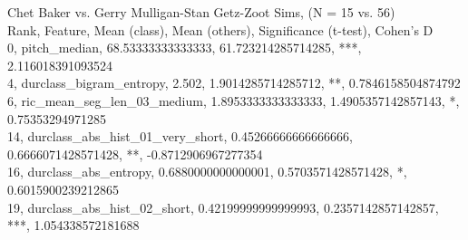 Chet Baker vs. Gerry Mulligan-Stan Getz-Zoot Sims, (N = 15 vs. 56)\\
Rank, Feature, Mean (class), Mean (others), Significance (t-test), Cohen's D\\
0, pitch_median, 68.53333333333333, 61.723214285714285, ***, 2.116018391093524\\
4, durclass_bigram_entropy, 2.502, 1.9014285714285712, **, 0.7846158504874792\\
6, ric_mean_seg_len_03_medium, 1.8953333333333333, 1.4905357142857143, *, 0.75353294971285\\
14, durclass_abs_hist_01_very_short, 0.45266666666666666, 0.6666071428571428, **, -0.8712906967277354\\
16, durclass_abs_entropy, 0.6880000000000001, 0.5703571428571428, *, 0.6015900239212865\\
19, durclass_abs_hist_02_short, 0.42199999999999993, 0.2357142857142857, ***, 1.054338572181688\\

